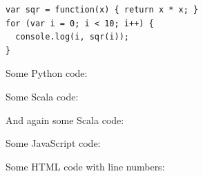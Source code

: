 \documentclass[a4paper, 12pt, listof=totoc, bibliography=totoc]{scrreprt}
\begin{document}
\begin{lstlisting}
var sqr = function(x) { return x * x; }
for (var i = 0; i < 10; i++) {
  console.log(i, sqr(i));
}
\end{lstlisting}

Some Python code:





Some Scala code:


And again some Scala code:





Some JavaScript code:





Some HTML code with line numbers:







\listoffigures


%
%
%
\end{document}
